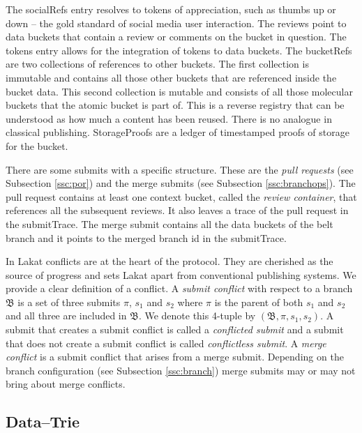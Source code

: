 The socialRefs entry resolves to tokens of appreciation, such as thumbs up or down -- the gold standard of social media user interaction. The reviews point to data buckets that contain a review or comments on the bucket in question. The tokens entry allows for the integration of tokens to data buckets. The bucketRefs are two collections of references to other buckets. The first collection is immutable and contains all those other buckets that are referenced inside the bucket data. This second collection is mutable and consists of all those molecular buckets that the atomic bucket is part of. This is a reverse registry that can be understood as how much a content has been reused. There is no analogue in classical publishing. StorageProofs are a ledger of timestamped proofs of storage for the bucket.  

There are some submits with a specific structure. These are the \textit{pull requests} (see Subsection \ref{ssc:por}) and the merge submits (see Subsection \ref{ssc:branchops}). The pull request  contains at least one context bucket, called the \textit{review container}, that references all the subsequent reviews. It also leaves a trace of the pull request in the submitTrace. The merge submit contains 
all the data buckets of the belt branch and it points to the merged branch id in the submitTrace. 

In Lakat conflicts are at the heart of the protocol. They are cherished as the source of progress and sets Lakat apart from conventional publishing systems. We provide a clear definition of a conflict. A \textit{submit conflict} with respect to a branch $\mathfrak B$ is a set 
of three submits $\pi$, $s_1$ and $s_2$ where $\pi$ is the parent of both $s_1$ and $s_2$ and all three are included in $\mathfrak B$. We denote this 4-tuple by $(\mathfrak B, \pi, s_1, s_2)$.
A submit that creates a submit conflict is called a \textit{conflicted submit} and a submit that does not create a submit conflict is called \textit{conflictless submit}.
A \textit{merge conflict} is a submit conflict that arises from a merge submit. Depending on the branch configuration (see Subsection \ref{ssc:branch}) merge submits may or may not bring about merge conflicts. 


\subsection{Data--Trie}
\label{ssc:datatrie}

